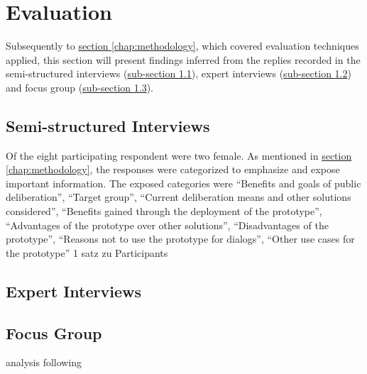 \section{Evaluation}
\label{chap:evaluation}
Subsequently to \hyperref[chap:methodology]{section \ref{chap:methodology}}, which covered evaluation techniques applied, this section will present findings inferred from the replies recorded in the semi-structured interviews (\hyperref[sub:ev_interviews]{sub-section \ref{sub:ev_interviews}}), expert interviews (\hyperref[sub:ev_expert_interviews]{sub-section \ref{sub:ev_expert_interviews}}) and focus group (\hyperref[sub:ev_focus]{sub-section \ref{sub:ev_focus}}).


\subsection{Semi-structured Interviews}
\label{sub:ev_interviews}
Of the eight participating respondent were two female. As mentioned in \hyperref[chap:methodology]{section \ref{chap:methodology}}, the responses were categorized to emphasize and expose important information. The exposed categories were ``Benefits and goals of public deliberation'', ``Target group'', ``Current deliberation means and other solutions considered'', ``Benefits gained through the deployment of the prototype'', ``Advantages of the prototype over other solutions'', ``Disadvantages of the prototype'', ``Reasons not to use the prototype for dialogs'', ``Other use cases for the prototype''
1 satz zu Participants

\subsection{Expert Interviews}
\label{sub:ev_expert_interviews}

\subsection{Focus Group}
\label{sub:ev_focus}
analysis following \cite{asbury1995overview}